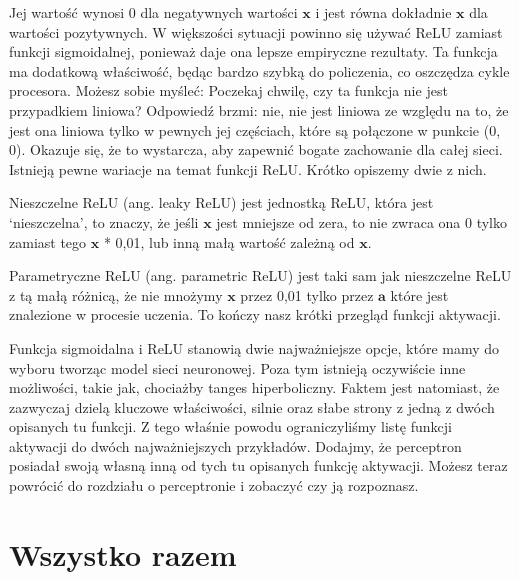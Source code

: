 Jej wartość wynosi 0 dla negatywnych wartości $\boldsymbol{x}$ i jest równa dokładnie $\boldsymbol{x}$ dla wartości pozytywnych. W większości sytuacji powinno się używać ReLU zamiast funkcji sigmoidalnej, ponieważ daje ona lepsze empiryczne rezultaty. Ta funkcja ma dodatkową właściwość, będąc bardzo szybką do policzenia, co oszczędza cykle procesora. Możesz sobie myśleć: Poczekaj chwilę, czy ta funkcja nie jest przypadkiem liniowa? Odpowiedź brzmi: nie, nie jest liniowa ze względu na to, że jest ona liniowa tylko w pewnych jej częściach, które są połączone w punkcie (0, 0). Okazuje się, że to wystarcza, aby zapewnić bogate zachowanie dla całej sieci. Istnieją pewne wariacje na temat funkcji ReLU. Krótko opiszemy dwie z nich.\newline

\noindent Nieszczelne ReLU (ang. leaky ReLU) jest jednostką ReLU, która jest ‘nieszczelna’, to znaczy, że jeśli $\boldsymbol{x}$ jest mniejsze od zera, to nie zwraca ona 0 tylko zamiast tego $\boldsymbol{x}$ * 0,01, lub inną małą wartość zależną od $\boldsymbol{x}$.\newline

\noindent Parametryczne ReLU (ang. parametric ReLU) jest taki sam jak nieszczelne ReLU z tą małą różnicą, że nie mnożymy $\boldsymbol{x}$ przez 0,01 tylko przez $\boldsymbol{a}$ które jest znalezione w procesie uczenia. To kończy nasz krótki przegląd funkcji aktywacji.\newline

Funkcja sigmoidalna i ReLU stanowią dwie najważniejsze opcje, które mamy do wyboru tworząc model sieci neuronowej. Poza tym istnieją oczywiście inne możliwości, takie jak, chociażby tanges hiperboliczny. Faktem jest natomiast, że zazwyczaj dzielą kluczowe właściwości, silnie oraz słabe strony z jedną z dwóch opisanych tu funkcji. Z tego właśnie powodu ograniczyliśmy listę funkcji aktywacji do dwóch najważniejszych przykładów. Dodajmy, że perceptron posiadał swoją własną inną od tych tu opisanych funkcję aktywacji. Możesz teraz powrócić do rozdziału o perceptronie i zobaczyć czy ją rozpoznasz.


\section{Wszystko razem}

